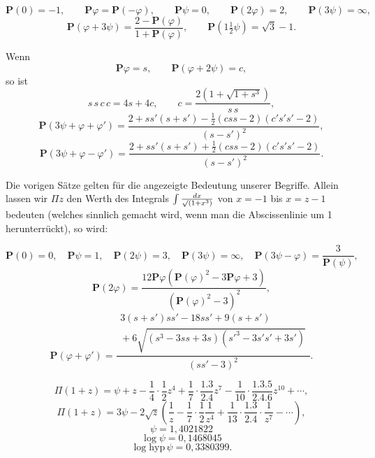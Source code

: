 \clearpage
{}%

\[
\boldsymbol{P}(0)=-1,\qquad \boldsymbol{P}\varphi=\boldsymbol{P}(-\varphi),\qquad
\boldsymbol{P}\psi=0,\qquad \boldsymbol{P}(2\varphi)=2,\qquad \boldsymbol{P}(3\psi)=\infty,
\]
\[
\boldsymbol{P}(\varphi+3\psi)=\frac{2-\boldsymbol{P}(\varphi)}{1+\boldsymbol{P}(\varphi)},
\qquad \boldsymbol{P}(1\tfrac12\psi)=\sqrt{3}-1.
\]

\noindent Wenn
\[
\boldsymbol{P}\varphi=s,\qquad \boldsymbol{P}(\varphi+2\psi)=c,
\]
\noindent so ist
\[
s\,s\,c\,c=4s+4c,\qquad c=\frac{2(1+\sqrt{1+s^3})}{s\,s},
\]
\[
\boldsymbol{P}(3\psi+\varphi+\varphi')=
\frac{2+s s'(s+s')-\tfrac12(c s s-2)(c' s' s'-2)}{(s-s')^2},
\]
\[
\boldsymbol{P}(3\psi+\varphi-\varphi')=
\frac{2+s s'(s+s')+\tfrac12(c s s-2)(c' s' s'-2)}{(s-s')^2}.
\]



Die vorigen Sätze gelten für die angezeigte Bedeutung unserer Begriffe. Allein lassen wir
$\Pi z$ den Werth des Integrals $\int \frac{dx}{\mathord{\surd}(1+x^3)}$ von $x=-1$ bis $x=z-1$
bedeuten (welches sinnlich gemacht wird, wenn man die Abscissenlinie um 1 herunterrückt),
so wird:

\[
\boldsymbol{P}(0)=0,\quad \boldsymbol{P}\psi=1,\quad \boldsymbol{P}(2\psi)=3,\quad
\boldsymbol{P}(3\psi)=\infty,\quad \boldsymbol{P}(3\psi-\varphi)=\frac{3}{\boldsymbol{P}(\psi)},
\]
\[
\boldsymbol{P}(2\varphi)=
\frac{12\boldsymbol{P}\varphi\left(\boldsymbol{P}(\varphi)^2-3\boldsymbol{P}\varphi+3\right)}
{\left(\boldsymbol{P}(\varphi)^2-3\right)^2},
\]
\[
\boldsymbol{P}(\varphi+\varphi')=
\frac{\begin{gathered}3(s+s')s s'-18 s s'+9(s+s')\\{}+6\sqrt{(s^3-3ss+3s)(s'^3-3s's'+3s')}\end{gathered}}{(ss'-3)^2}.
\]



\[
\Pi(1+z)=\psi+z-\frac14\cdot\frac12 z^4+\frac17\cdot\frac{1.3}{2.4}z^7
-\frac{1}{10}\cdot\frac{1.3.5}{2.4.6}z^{10}+\cdots,
\]
\[
\Pi(1+z)=3\psi-2\sqrt{z}\left(\frac1z-\frac17\cdot\frac12\frac{1}{z^4}
+\frac{1}{13}\cdot\frac{1.3}{2.4}\cdot\frac{1}{z^7}-\cdots\right),
\]
\[
\psi=1{,}4021822
\]
\[
\log\psi=0{,}1468045
\]
\[
\log\mathrm{hyp}\,\psi=0{,}3380399.
\]


